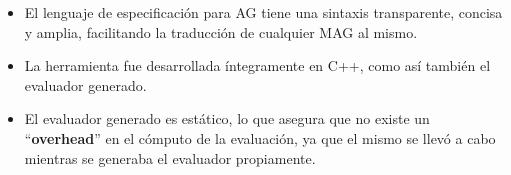 \documentclass[runningheads,a4paper]{llncs}
\begin{document}
\begin{itemize}
    \item El lenguaje de especificación para AG tiene una sintaxis transparente, concisa y amplia, facilitando la traducción de cualquier MAG al mismo.

    \item La herramienta fue desarrollada íntegramente en C++, como así también el evaluador generado.


    \item El evaluador generado es estático, lo que asegura que no existe un ``\textbf{overhead}'' en el cómputo de la evaluación, ya que el mismo se llevó a cabo mientras se generaba el evaluador propiamente.
\end{itemize}
\end{document}
